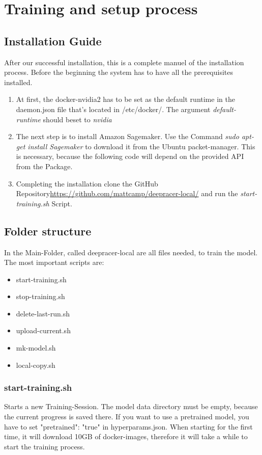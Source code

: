 \section{Training and setup process}

\subsection{Installation Guide}
After our successful installation, this is a complete manuel of the installation process. \newline Before the beginning the system has to have all the prerequisites installed.

\begin{enumerate}
    \item At first, the docker-nvidia2 has to be set as the default runtime in the daemon.json file that's located in /etc/docker/.
    \newline The argument \textsl{default-runtime} should beset to \textsl{nvidia} 
    \item The next step is to install Amazon Sagemaker. Use the Command \textsl{sudo apt-get install Sagemaker}  to download it from the Ubuntu packet-manager. This is necessary, because the following code will depend on the provided API from the Package.
    \item Completing the installation clone the GitHub Repository\url{https://github.com/mattcamp/deepracer-local/} and run the \textsl{start-training.sh} Script.
\end{enumerate}


\subsection{Folder structure}
In the Main-Folder, called deepracer-local are all files needed, to train the model.
The most important scripts are:

\begin{itemize}
    \item start-training.sh
    \item stop-training.sh
    \item delete-last-run.sh
    \item upload-current.sh
    \item mk-model.sh
    \item local-copy.sh
\end{itemize}

\subsubsection{start-training.sh}
Starts a new Training-Session. The model data directory must be empty, because the current progress is saved there. If you want to use a pretrained model, you have to set "pretrained": "true" in hyperparams.json. When starting for the first time, it will download 10GB of docker-images, therefore it will take a while to start the training process.

